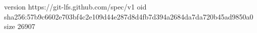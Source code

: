 version https://git-lfs.github.com/spec/v1
oid sha256:57b9c6602e703bf4c2e109d44e287d8d4fb7d394a2684da7da720b45ad9850a0
size 26907
